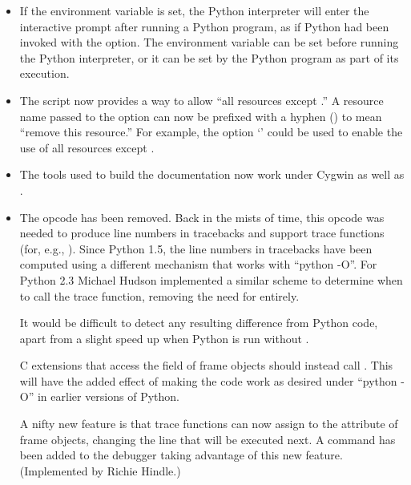 \documentclass{howto}
\begin{document}
\begin{itemize}

\item If the  environment variable is set, the
Python interpreter will enter the interactive prompt after running a
Python program, as if Python had been invoked with the 
option. The environment variable can be set before running the Python
interpreter, or it can be set by the Python program as part of its
execution.

\item The  script now provides a way to allow ``all
resources except .''  A resource name passed to the
 option can now be prefixed with a hyphen
(\character{-}) to mean ``remove this resource.''  For example, the
option `' could be used to enable the
use of all resources except .

\item The tools used to build the documentation now work under Cygwin
as well as \UNIX.

\item The  opcode has been removed.  Back in the
mists of time, this opcode was needed to produce line numbers in
tracebacks and support trace functions (for, e.g., ).
Since Python 1.5, the line numbers in tracebacks have been computed
using a different mechanism that works with ``python -O''.  For Python
2.3 Michael Hudson implemented a similar scheme to determine when to
call the trace function, removing the need for 
entirely.

It would be difficult to detect any resulting difference from Python
code, apart from a slight speed up when Python is run without
.

C extensions that access the  field of frame objects
should instead call .
This will have the added effect of making the code work as desired
under ``python -O'' in earlier versions of Python.

A nifty new feature is that trace functions can now assign to the
 attribute of frame objects, changing the line that
will be executed next.  A  command has been added to the
 debugger taking advantage of this new feature.
(Implemented by Richie Hindle.)

\end{itemize}
\end{document}
